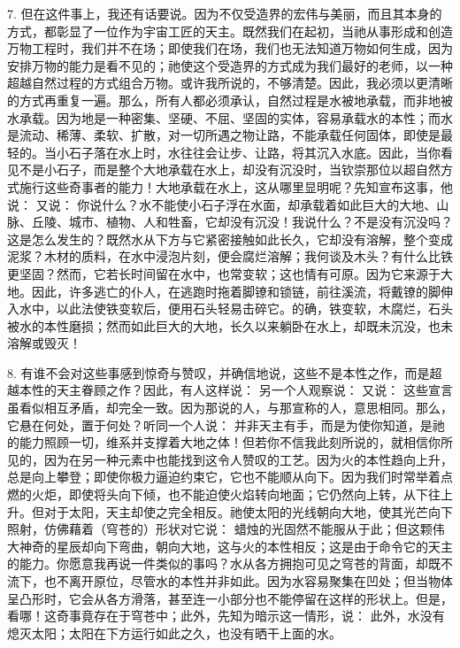7. 但在这件事上，我还有话要说。因为不仅受造界的宏伟与美丽，而且其本身的方式，都彰显了一位作为宇宙工匠的天主。既然我们在起初，当祂从事形成和创造万物工程时，我们并不在场；即使我们在场，我们也无法知道万物如何生成，因为安排万物的能力是看不见的；祂使这个受造界的方式成为我们最好的老师，以一种超越自然过程的方式组合万物。或许我所说的，不够清楚。因此，我必须以更清晰的方式再重复一遍。那么，所有人都必须承认，自然过程是水被地承载，而非地被水承载。因为地是一种密集、坚硬、不屈、坚固的实体，容易承载水的本性；而水是流动、稀薄、柔软、扩散，对一切所遇之物让路，不能承载任何固体，即使是最轻的。当小石子落在水上时，水往往会让步、让路，将其沉入水底。因此，当你看见不是小石子，而是整个大地承载在水上，却没有沉没时，当钦崇那位以超自然方式施行这些奇事者的能力！大地承载在水上，这从哪里显明呢？先知宣布这事，他说： 又说： 你说什么？水不能使小石子浮在水面，却承载着如此巨大的大地、山脉、丘陵、城市、植物、人和牲畜，它却没有沉没！我说什么？不是没有沉没吗？这是怎么发生的？既然水从下方与它紧密接触如此长久，它却没有溶解，整个变成泥浆？木材的质料，在水中浸泡片刻，便会腐烂溶解；我何谈及木头？有什么比铁更坚固？然而，它若长时间留在水中，也常变软；这也情有可原。因为它来源于大地。因此，许多逃亡的仆人，在逃跑时拖着脚镣和锁链，前往溪流，将戴镣的脚伸入水中，以此法使铁变软后，便用石头轻易击碎它。的确，铁变软，木腐烂，石头被水的本性磨损；然而如此巨大的大地，长久以来躺卧在水上，却既未沉没，也未溶解或毁灭！\par

8. 有谁不会对这些事感到惊奇与赞叹，并确信地说，这些不是本性之作，而是超越本性的天主眷顾之作？因此，有人这样说： 另一个人观察说： 又说： 这些宣言虽看似相互矛盾，却完全一致。因为那说的人，与那宣称的人，意思相同。那么，它悬在何处，置于何处？听同一个人说： 并非天主有手，而是为使你知道，是祂的能力照顾一切，维系并支撑着大地之体！但若你不信我此刻所说的，就相信你所见的，因为在另一种元素中也能找到这令人赞叹的工艺。因为火的本性趋向上升，总是向上攀登；即使你极力逼迫约束它，它也不能顺从向下。因为我们时常举着点燃的火炬，即使将头向下倾，也不能迫使火焰转向地面；它仍然向上转，从下往上升。但对于太阳，天主却使之完全相反。祂使太阳的光线朝向大地，使其光芒向下照射，仿佛藉着（穹苍的）形状对它说： 蜡烛的光固然不能服从于此；但这颗伟大神奇的星辰却向下弯曲，朝向大地，这与火的本性相反；这是由于命令它的天主的能力。你愿意我再说一件类似的事吗？水从各方拥抱可见之穹苍的背面，却既不流下，也不离开原位，尽管水的本性并非如此。因为水容易聚集在凹处；但当物体呈凸形时，它会从各方滑落，甚至连一小部分也不能停留在这样的形状上。但是，看哪！这奇事竟存在于穹苍中；此外，先知为暗示这一情形，说： 此外，水没有熄灭太阳；太阳在下方运行如此之久，也没有晒干上面的水。\par

